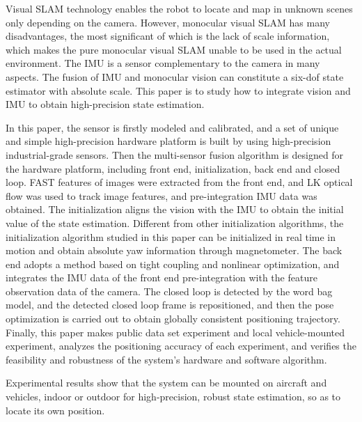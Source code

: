 \begin{englishabstract}

   Visual SLAM technology enables the robot to locate and map in unknown scenes only depending on the camera. However, monocular visual SLAM has many disadvantages, the most significant of which is the lack of scale information, which makes the pure monocular visual SLAM unable to be used in the actual environment. The IMU is a sensor complementary to the camera in many aspects. The fusion of IMU and monocular vision can constitute a six-dof state estimator with absolute scale. This paper is to study how to integrate vision and IMU to obtain high-precision state estimation.
   
   In this paper, the sensor is firstly modeled and calibrated, and a set of unique and simple high-precision hardware platform is built by using high-precision industrial-grade sensors. Then the multi-sensor fusion algorithm is designed for the hardware platform, including front end, initialization, back end and closed loop. FAST features of images were extracted from the front end, and LK optical flow was used to track image features, and pre-integration IMU data was obtained. The initialization aligns the vision with the IMU to obtain the initial value of the state estimation. Different from other initialization algorithms, the initialization algorithm studied in this paper can be initialized in real time in motion and obtain absolute yaw information through magnetometer. The back end adopts a method based on tight coupling and nonlinear optimization, and integrates the IMU data of the front end pre-integration with the feature observation data of the camera. The closed loop is detected by the word bag model, and the detected closed loop frame is repositioned, and then the pose optimization is carried out to obtain globally consistent positioning trajectory. Finally, this paper makes public data set experiment and local vehicle-mounted experiment, analyzes the positioning accuracy of each experiment, and verifies the feasibility and robustness of the system's hardware and software algorithm.
   
   Experimental results show that the system can be mounted on aircraft and vehicles, indoor or outdoor for high-precision, robust state estimation, so as to locate its own position.
   


\end{englishabstract}
